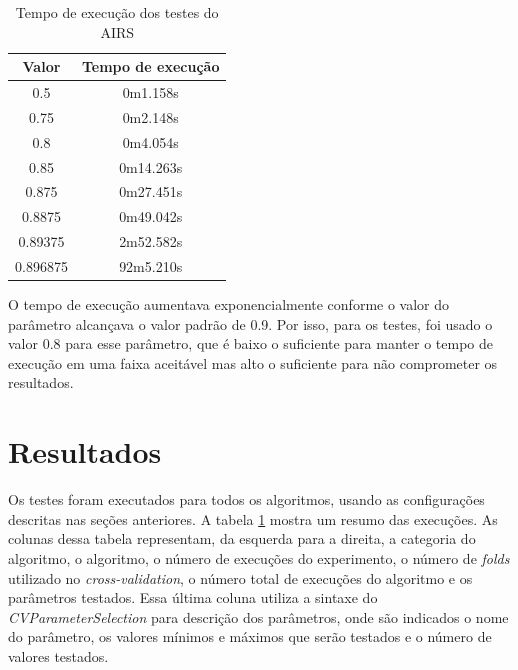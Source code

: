 \begin{table}[h]
    \vspace{0.5cm}
    \scriptsize
    \centering
    \caption{Tempo de execução dos testes do AIRS}
    \label{tbl:dev_exec_summary}
    \vspace{0.5cm}
    \begin{tabular}{c c}
        \textbf{Valor} & \textbf{Tempo de execução} \\
        \hline
        0.5            &  0m1.158s  \\
        0.75           &  0m2.148s  \\
        0.8            &  0m4.054s  \\
        0.85           &  0m14.263s \\
        0.875          &  0m27.451s \\
        0.8875         &  0m49.042s \\
        0.89375        &  2m52.582s \\
        0.896875       &  92m5.210s \\
    \end{tabular}
    \vspace{0.5cm}
\end{table}

O tempo de execução aumentava exponencialmente conforme o valor do parâmetro alcançava o valor padrão de 0.9. Por isso, para os testes, foi usado o valor 0.8 para esse parâmetro, que é baixo o suficiente para manter o tempo de execução em uma faixa aceitável mas alto o suficiente para não comprometer os resultados.

\section{Resultados}

Os testes foram executados para todos os algoritmos, usando as configurações descritas nas seções anteriores. A tabela \ref{tbl:dev_exec_summary} mostra um resumo das execuções. As colunas dessa tabela representam, da esquerda para a direita, a categoria do algoritmo, o algoritmo, o número de execuções do experimento, o número de \emph{folds} utilizado no \emph{cross-validation}, o número total de execuções do algoritmo e os parâmetros testados. Essa última coluna utiliza a sintaxe do \emph{CVParameterSelection} para descrição dos parâmetros, onde são indicados o nome do parâmetro, os valores mínimos e máximos que serão testados e o número de valores testados.

